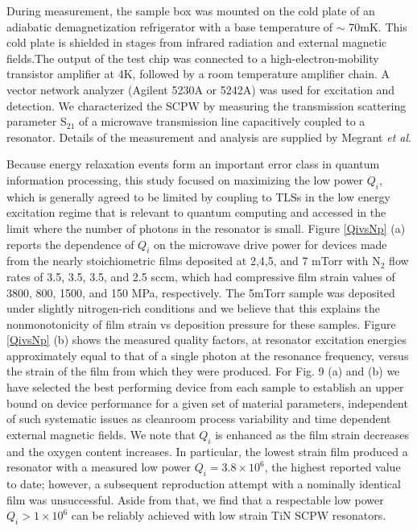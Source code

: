 \documentclass{report}
\begin{document}
During measurement, the sample box was mounted on the cold plate of an adiabatic demagnetization refrigerator with a base temperature of $\sim$ 70mK.  This cold plate is shielded in stages from infrared radiation and external magnetic fields.\cite{Barends2011}The output of the test chip was connected to a high-electron-mobility transistor amplifier at 4K, followed by a room temperature amplifier chain. A vector network analyzer (Agilent 5230A or 5242A) was used for excitation and detection.  We characterized the SCPW by measuring the transmission scattering parameter S$_{21}$ of a microwave transmission line capacitively coupled to a resonator.  Details of the measurement and analysis are supplied by Megrant \textit{et al}. \cite{Megrant2012}

 Because energy relaxation events form an important error class in quantum information processing, this study focused on maximizing the low power $Q_{i}$, which is generally agreed to be limited by coupling to TLSs in the low energy excitation regime that is relevant to quantum computing and accessed in the limit where the number of photons in the resonator is small.  Figure \ref{QivsNp} (a) reports the dependence of $Q_{i}$ on the microwave drive power for devices made from the nearly stoichiometric films deposited at 2,4,5, and 7 mTorr with N$_{2}$ flow rates of 3.5, 3.5, 3.5, and 2.5 sccm, which had compressive film strain values of  3800, 800, 1500, and 150 MPa, respectively.  The 5mTorr sample was deposited under slightly nitrogen-rich conditions and we believe that this explains the nonmonotonicity of film strain vs deposition pressure for these samples.  Figure \ref{QivsNp} (b) shows the measured quality factors, at resonator excitation energies approximately equal to that of a single photon at the resonance frequency, versus the strain of the film from which they were produced.  For Fig. 9 (a) and (b) we have selected the best performing device from each sample to establish an upper bound on device performance for a  given set of material parameters, independent of such systematic issues as cleanroom process variability \cite{qiplotfn} and time dependent external magnetic fields.  We note that $Q_{i}$ is enhanced as the film strain decreases and the oxygen content increases.  In particular, the lowest strain film produced a resonator with a measured low power $Q_{i} = 3.8 \times 10^{6}$, the highest reported value to date; however,  a subsequent reproduction attempt with a nominally identical film was unsuccessful.  Aside from that, we find that a respectable low power $Q_{i} >1 \times 10^{6}$ can be reliably achieved with low strain TiN SCPW resonators.
 
\end{document}
